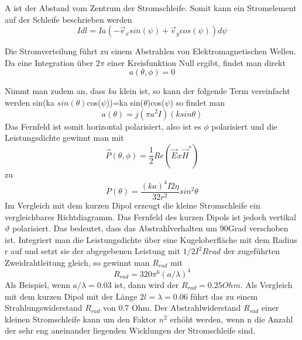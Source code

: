 A ist der Abstand vom Zentrum der Stromschleife. Somit kann ein Stromelement auf der Schleife beschrieben werden
\begin{equation}
I dl= Ia(- \vec e_{x}sin(\psi)+\vec e_{y}cos(\psi))d\psi
\end{equation}
 
Die Stromverteilung führt zu einem Abstrahlen von Elektromagnetischen Wellen.
Da eine Integration über $2\pi $ einer Kreisfunktion Null ergibt, findet man direkt 
\begin{equation}
a(\theta, \phi) =0
\end{equation}

Nimmt man zudem an, dass $ka$ klein ist, so kann der folgende Term vereinfacht werden sin(ka $sin(\theta)$cos($\psi$))=ka sin($\theta$)cos($\psi$) so findet man 
\begin{equation}
a(\theta)=j(\pi a^{2}I)(k sin \theta)
\end{equation}
Das Fernfeld ist somit horizontal polarisiert, also ist es $\phi$ polarisiert und die Leistungsdichte gewinnt man mit 
\begin{equation}
\vec P(\theta,\phi)=\frac{1}{2}Re(\vec E x \vec H^*)
\end{equation}
zu
\begin{equation}
P(\theta)=\frac{(ka)^{4}I{2}\eta}{32r^{2}}sin^{2}\theta
\end{equation}
Im Vergleich mit dem kurzen Dipol erzeugt die kleine Stromschleife ein vergleichbares Richtdiagramm. Das Fernfeld des kurzen Dipols ist jedoch vertikal $\vartheta$ polarisiert. Das bedeutet, dass das Abstrahlverhalten um 90Grad verschoben ist. Integriert man die Leistungsdichte über eine Kugeloberfläche mit dem Radius r  auf und setzt sie der abgegebenen Leistung mit $1/2 I^{2}Rrad $ der zugeführten Zweidrahtleitung gleich, so gewinnt man $R_{rad}$ mit 
\begin{equation}
R_{rad} = 320\pi^{6} (a/\lambda)^{4}\label{eq:RradLoop}
\end{equation}
Als Beispiel, wenn $a/\lambda = 0.03$ ist, dann wird der $R_{rad} = 0.25 Ohm$. Als Vergleich mit dem kurzen Dipol mit der Länge $2l=\lambda= 0.06$ führt das zu einem Strahlungswiderstand $R_{rad}$ von 0.7 Ohm.  Der Abstrahlwiderstand $R_{rad}$ einer kleinen Stromschleife kann um den Faktor $n^{2}$ erhöht werden, wenn n die Anzahl der sehr eng aneinander liegenden Wicklungen der Stromschleife sind. 



